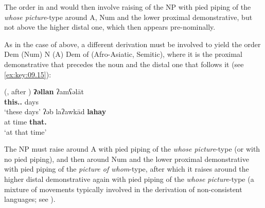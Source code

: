\documentclass[output=paper]{langsci/langscibook}
\begin{document}
\ea\label{ex:key:09.14}
\z

The order in  and  would then involve raising of the NP
with pied piping of the \emph{whose picture}-type around A, Num and the lower
proximal demonstrative, but not above the higher distal one, which then appears
pre-nominally.

As in the case of  above, a different derivation must be involved
to yield the order Dem (Num) N (A) Dem of 
(Afro-Asiatic, Semitic), where it is the proximal demonstrative that precedes
the noun and the distal one that follows it (see \eqref{ex:key:09.15}):

\ea {} (\citealt{Dryer2013}, after \citealt[45]{Raz1983})\label{ex:key:09.15}
	\ea
		\gll \textbf{ʔəllan}  ʔamʕəl\=at\\
			\textbf{this.\glossF.\Pl{}} days\\
		\glt ‘these days’
	\ex
		\gll ʔəb laʔawk\=ad  \textbf{lahay}\\
            at time \textbf{that.\M{}}\\
		\glt ‘at that time’
	\z
\z

The NP must raise around A with pied piping of the \emph{whose
picture}-type (or with no pied piping), and then around Num and the lower
proximal demonstrative with pied piping of the \emph{picture of
whom}-type, after which it raises around the higher distal demonstrative again
with pied piping of the \emph{whose picture}-type (a mixture of
movements typically involved in the derivation of non-consistent languages; see
\citealt{Cinque2017}).
\end{document}
